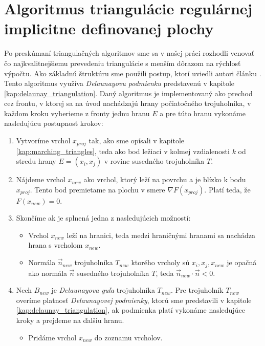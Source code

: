 \chapter{Algoritmus triangulácie regulárnej implicitne definovanej plochy}
\label{kap:algoritmus}
Po preskúmaní triangulačných algoritmov sme sa v našej práci rozhodli venovať čo najkvalitnejšiemu
prevedeniu triangulácie s menším dôrazom na rýchlosť výpočtu. Ako základnú štruktúru sme použili 
postup, ktorí uviedli autori článku \cite{hilton1996marching}. Tento algoritmus využíva 
\textit{Delaunayovu podmienku} predstavenú v kapitole \ref{kap:delaunay_triangulation}.
Daný algoritmus je implementovaný ako prechod cez frontu, v ktorej sa na úvod nachádzajú
hrany počiatočného trojuholníka, v každom kroku vyberieme z fronty jednu hranu $E$ a pre túto
hranu vykonáme nasledujúcu postupnosť krokov:
\begin{enumerate}
    \item{Vytvoríme vrchol $x_{proj}$ tak, ako sme opísali v kapitole \ref{kap:marching_triangles}, teda 
    ako bod ležiaci v kolmej vzdialenosti $k$ od stredu hrany $E = (x_i, x_j)$ 
    v rovine susedného trojuholníka $T$.}
    \item{Nájdeme vrchol $x_{new}$ ako vrchol, ktorý leží na povrchu a je blízko k bodu 
    $x_{proj}$. Tento bod premietame na plochu v smere $\nabla F(x_{proj})$.
    Platí teda, že $F(x_{new}) = 0$.}
    \item{Skončíme ak je splnená jedna z nasledujúcich možností:
    \begin{itemize}
        \item{Vrchol $x_{new}$ leží na hranici, teda medzi hraničnými 
        hranami sa nachádza hrana s vrcholom $x_{new}$.}
        \item{Normála $\vec{n}_{new}$ trojuholníka $T_{new}$ ktorého vrcholy sú $x_i, 
        x_j, x_{new}$ je opačná ako
        normála $\vec{n}$ susedného trojuholníka $T$, teda 
        $\vec{n}_{new} \cdot \vec{n} < 0$.}
    \end{itemize}
    }
    \item{Nech $B_{new}$ je \textit{Delaunayova guľa} trojuholníka $T_{new}$.
        Pre trojuholník $T_{new}$ overíme platnosť \textit{Delaunayovej podmienky}, 
    ktorú sme predstavili v kapitole \ref{kap:delaunay_triangulation}, ak podmienka platí
    vykonáme nasledujúce kroky a prejdeme na ďalšiu hranu.
    \begin{itemize}
        \item{Pridáme vrchol $x_{new}$ do zoznamu vrcholov.}

\end{itemize}}
\end{enumerate}
